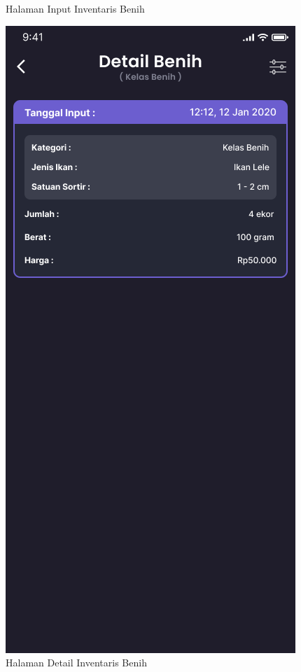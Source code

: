 \begin{enumerate}
\begin{enumerate}
\begin{figure}[H]
			  \caption{Halaman Input Inventaris Benih}
			\endminipage\hfill
			  \includegraphics[width=\linewidth]{gambar/sprint1/mockup_list_seed.png}
			  \caption{Halaman Detail Inventaris Benih}
			\endminipage
		\end{figure}


\end{enumerate}
\end{enumerate}
